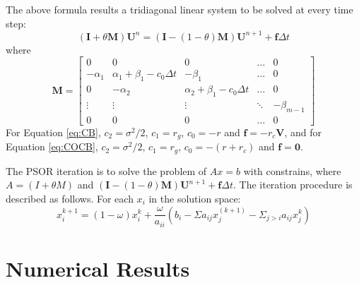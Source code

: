 \documentclass[12pt]{article}
\begin{document}
The above formula results a tridiagonal linear system to be solved at every time step:
\begin{equation}
(\mathbf{I} + \theta \mathbf{M}) \mathbf{U}^{n} = (\mathbf{I} - (1-\theta)\mathbf{M})\mathbf{U}^{n+1} + \mathbf{f}\Delta t
\end{equation}
where
\begin{equation}
\mathbf{M} = 
\begin{bmatrix}
0         & 0        & 0 		  & \dots & 0\\
-\alpha_1 & \alpha_1 + \beta_1 - c_0\Delta t & -\beta_1 & \dots & 0\\
0         & -\alpha_2  & \alpha_2 + \beta_1 - c_0\Delta t & \dots & 0 \\                 
\vdots & \vdots & \vdots & \ddots & -\beta_{m-1} \\
0 & 0 & 0 & \dots & 0
\end{bmatrix}
\end{equation}
For Equation \ref{eq:CB}, $c_2 = \sigma^2/2$, $c_1 = r_g$, $c_0 = -r$ and $\mathbf{f} = -r_c \mathbf{V}$, and for Equation \ref{eq:COCB}, $c_2 = \sigma^2/2$, $c_1 = r_g$, $c_0 = -(r+r_c)$ and $\mathbf{f} = \mathbf{0}$.

The PSOR iteration is to solve the problem of $Ax = b$ with constrains, 
where $A = (I + \theta M)$ and $(\mathbf{I} - (1-\theta)\mathbf{M})\mathbf{U}^{n+1} + \mathbf{f}\Delta t$.
The iteration procedure is described as follows. For each $x_i$ in the solution space:
\begin{equation}
x_i^{k+1} = (1-\omega)x_i^{k} + \frac{\omega}{a_{ii}}(b_i - \Sigma a_{ij}x_{j}^{(k+1)} - \Sigma_{j > i}a_{ij}x_j^{k})
\end{equation}
\section{Numerical Results}
\end{document}
